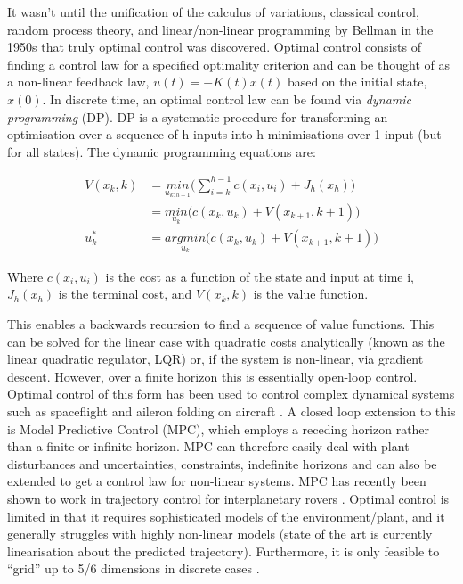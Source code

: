 \documentclass[../main.tex]{subfiles}
\begin{document}
It wasn't until the unification of the calculus of variations, classical control, random process theory, and linear/non-linear programming by Bellman in the 1950s \cite{History} that truly optimal control was discovered. Optimal control consists of finding a control law for a specified optimality criterion and can be thought of as a non-linear feedback law, $u(t) = -K(t)x(t)$ based on the initial state, $x(0)$. In discrete time, an optimal control law can be found via \textit{dynamic programming} (DP). DP is a systematic procedure for transforming an optimisation over a sequence of h inputs into h minimisations over 1 input (but for all states). The dynamic programming equations are:

\begin{align}
    \label{equ:detval} 
    V(x_k, k) & = \underset{u_{k:h-1}}{min} \bigg( \sum_{i=k}^{h-1} c(x_i, u_i) + J_h(x_h) \bigg) \\ 
    & = \underset{u_k}{min} \Big( c(x_k, u_k) + V(x_{k+1}, k+1) \Big) \\
    u^{*}_k & = \underset{u_k}{argmin} \Big( c(x_k, u_k) + V(x_{k+1}, k+1) \Big)
\end{align}

Where $c(x_i, u_i)$ is the cost as a function of the state and input at time i, $J_h(x_h)$ is the terminal cost, and $V(x_k, k)$ is the value function.

This enables a backwards recursion to find a sequence of value functions. This can be solved for the linear case with quadratic costs analytically (known as the linear quadratic regulator, LQR) or, if the system is non-linear, via gradient descent. However, over a finite horizon this is essentially open-loop control. Optimal control of this form has been used to control complex dynamical systems such as spaceflight and aileron folding on aircraft \cite{aircraftoptcont, aileronoptcont}. A closed loop extension to this is Model Predictive Control (MPC), which employs a receding horizon rather than a finite or infinite horizon. MPC can therefore easily deal with plant disturbances and uncertainties, constraints, indefinite horizons and can also be extended to get a control law for non-linear systems. MPC has recently been shown to work in trajectory control for interplanetary rovers \cite{rovermpc}. Optimal control is limited in that it requires sophisticated models of the environment/plant, and it generally struggles with highly non-linear models (state of the art is currently linearisation about the predicted trajectory). Furthermore, it is only feasible to ``grid'' up to 5/6 dimensions in discrete cases \cite{4f3}.
\end{document}
